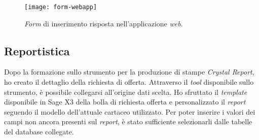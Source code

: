 \begin{figure}[htbp]
	\begin{center}
		\texttt{[image: form-webapp]}
		\caption{\textit{Form} di inserimento risposta nell'applicazione \textit{web}.}
	\end{center}
\end{figure}

\newpage 
\subsection{Reportistica}
Dopo la formazione sullo strumento per la produzione di stampe \textit{Crystal Report}, ho creato il dettaglio della richiesta di offerta.
Attraverso il \textit{tool} disponibile sullo strumento, è possibile collegarsi all'origine dati scelta.
Ho sfruttato il \textit{template} disponibile in Sage X3 della bolla di richiesta offerta e personalizzato il \textit{report} seguendo il modello dell'attuale cartaceo utilizzato.
Per poter inserire i valori dei campi non ancora presenti sul \textit{report}, è stato sufficiente selezionarli dalle tabelle del database collegate.

